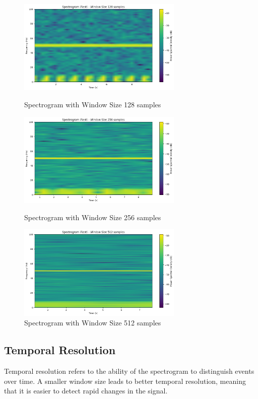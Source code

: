 \documentclass[10pt]{article}
\theoremstyle{definition}
\theoremstyle{remark}
\theoremstyle{definition}
\numberwithin{equation}{prob}
\begin{document}
\begin{figure}[H]
    \centering
    \includegraphics[width=0.7\textwidth]{./figures/Spectrogram (Rest) - Window Size 128 samples.png}
    \caption{Spectrogram with Window Size 128 samples}
    
    \includegraphics[width=0.7\textwidth]{./figures/Spectrogram (Rest) - Window Size 256 samples.png}
    \caption{Spectrogram with Window Size 256 samples}
    
    \includegraphics[width=0.7\textwidth]{./figures/Spectrogram (Rest) - Window Size 512 samples.png}
    \caption{Spectrogram with Window Size 512 samples}
    
    \label{fig:spectrograms}
\end{figure}

\subsection{Temporal Resolution}
Temporal resolution refers to the ability of the spectrogram to distinguish events over time. A smaller window size leads to better temporal resolution, meaning that it is easier to detect rapid changes in the signal.
\end{document}
